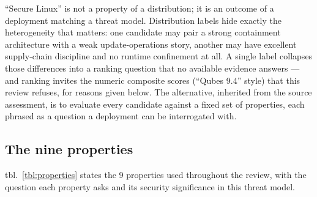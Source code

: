 \documentclass[
  english,
  9pt,
]{extarticle}
\begin{document}
``Secure Linux'' is not a property of a distribution; it is an outcome
of a deployment matching a threat model. Distribution labels hide
exactly the heterogeneity that matters: one candidate may pair a strong
containment architecture with a weak update-operations story, another
may have excellent supply-chain discipline and no runtime confinement at
all. A single label collapses those differences into a ranking question
that no available evidence answers --- and ranking invites the numeric
composite scores (``Qubes 9.4'' style) that this review refuses, for
reasons given below. The alternative, inherited from the source
assessment, is to evaluate every candidate against a fixed set of
properties, each phrased as a question a deployment can be interrogated
with.

\subsection{The nine properties}\label{the-nine-properties}

tbl.~\ref{tbl:properties} states the 9 properties used throughout the
review, with the question each property asks and its security
significance in this threat model.
\end{document}
